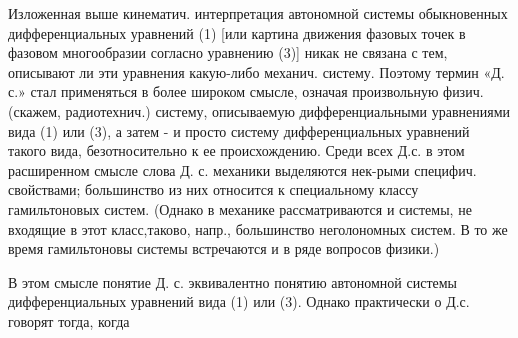 \documentclass[10pt]{article}
\begin{document}
Изложенная выше кинематич. интерпретация автономной системы обыкновенных дифференциальных уравнений (1) [или картина движения фазовых точек в фазовом многообразии согласно уравнению (3)] никак не связана с тем, описывают ли эти уравнения какую-либо механич. систему. Поэтому термин «Д. с.» стал применяться в более широком смысле, означая произвольную физич. (скажем, радиотехнич.) систему, описываемую дифференциальными уравнениями вида (1) или (3), а затем - и просто систему дифференциальных уравнений такого вида, безотносительно к ее происхождению. Среди всех Д.с. в этом расширенном смысле слова Д. с. механики выделяются нек-рыми специфич. свойствами; большинство из них относится к специальному классу гамильтоновых систем. (Однако в механике рассматриваются и системы, не входящие в этот класс,таково, напр., большинство неголономных систем. В то же время гамильтоновы системы встречаются и в ряде вопросов физики.)



В этом смысле понятие Д. с. эквивалентно понятию автономной системы дифференциальных уравнений вида (1) или (3). Однако практически о Д.с. говорят тогда, когда
\end{document}
